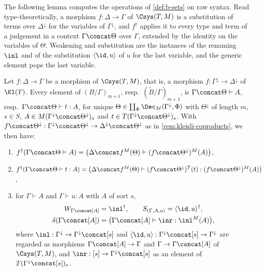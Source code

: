 The following lemma computes the operations of \cref{def:b-sets} on raw syntax. Read type-theoretically, a morphism $f : \Delta \to \Gamma$ of $\Csys(T, M)$ is a substitution of terms over $\Delta^{\downarrow}$ for the variables of $\Gamma^{\downarrow}$, and $f^\dagger$ applies it to every type and term of a judgement in a context $\Gamma \concat \Theta$ over $\Gamma$, extended by the identity on the variables of $\Theta$. Weakening and substitution are the instances of the renaming $\inl$ and of the substitution $\langle \id, u \rangle$ of $u$ for the last variable, and the generic element pops the last variable.

\begin{lemma}\label{lem:b-sets-raw}
    Let $f : \Delta \to \Gamma$ be a morphism of $\Csys(T, M)$, that is, a morphism $f : \Gamma^{\downarrow} \to \Delta^{\downarrow}$ of $\Kl(T)$. Every element of $(B/\Gamma)_{m+1}$, resp.\ $(\widetilde{B}/\Gamma)_{m+1}$, is $\Gamma \concat \Theta \vdash A$, resp.\ $\Gamma \concat \Theta \vdash t : A$, for unique $\Theta \in \coprod_{\Phi} \Dec_M(\Gamma^{\downarrow}, \Phi)$ with $\Theta^{\downarrow}$ of length $m$, $s \in S$, $A \in M(\Gamma^{\downarrow} \concat \Theta^{\downarrow})_s$ and $t \in T(\Gamma^{\downarrow} \concat \Theta^{\downarrow})_s$. With $f \concat \Theta^{\downarrow} : \Gamma^{\downarrow} \concat \Theta^{\downarrow} \to \Delta^{\downarrow} \concat \Theta^{\downarrow}$ as in \cref{rem:kleisli-coproducts}, we then have:
    \begin{enumerate}
        \item $f^\dagger(\Gamma \concat \Theta \vdash A) = \big(\Delta \concat f^M(\Theta) \vdash (f \concat \Theta^{\downarrow})^M(A)\big)$,
        \item $f^\dagger(\Gamma \concat \Theta \vdash t : A) = \big(\Delta \concat f^M(\Theta) \vdash (f \concat \Theta^{\downarrow})^T(t) : (f \concat \Theta^{\downarrow})^M(A)\big)$,
        \item for $\Gamma \vdash A$ and $\Gamma \vdash u : A$ with $A$ of sort $s$,
        \begin{gather*}
            W_{\Gamma \concat [A]} = \inl^\dagger, \qquad S_{(\Gamma, A, u)} = \langle \id, u \rangle^\dagger,\\
            \delta(\Gamma \concat [A]) = \big(\Gamma \concat [A] \vdash \inr : \inl^M(A)\big),
        \end{gather*}
        where $\inl : \Gamma^{\downarrow} \to \Gamma^{\downarrow} \concat [s]$ and $\langle \id, u \rangle : \Gamma^{\downarrow} \concat [s] \to \Gamma^{\downarrow}$ are regarded as morphisms $\Gamma \concat [A] \to \Gamma$ and $\Gamma \to \Gamma \concat [A]$ of $\Csys(T, M)$, and $\inr : [s] \to \Gamma^{\downarrow} \concat [s]$ as an element of $T(\Gamma^{\downarrow} \concat [s])_s$.
    \end{enumerate}
\end{lemma}

